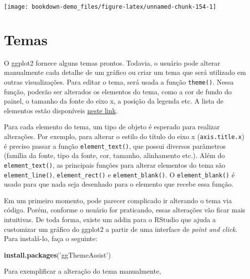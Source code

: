 \documentclass[]{book}
\newenvironment{Shaded}{\begin{snugshade}}{\end{snugshade}}
\newcommand{\KeywordTok}[1]{\textcolor[rgb]{0.13,0.29,0.53}{\textbf{#1}}}
\newcommand{\StringTok}[1]{\textcolor[rgb]{0.31,0.60,0.02}{#1}}
\newcommand{\NormalTok}[1]{#1}
\begin{document}
\begin{center}\texttt{[image: bookdown-demo\_files/figure-latex/unnamed-chunk-154-1]} \end{center}

\section{Temas}\label{temas}

O ggplot2 fornece alguns temas prontos. Todavia, o usuário pode alterar
manualmente cada detalhe de um gráfico ou criar um tema que será
utilizado em outras visualizações. Para editar o tema, será usada a
função \texttt{theme()}. Nessa função, poderão ser alterados os
elementos do tema, como a cor de fundo do painel, o tamanho da fonte do
eixo x, a posição da legenda etc. A lista de elementos estão disponíveis
\href{http://docs.ggplot2.org/current/theme.html}{neste link}.

Para cada elemento do tema, um tipo de objeto é esperado para realizar
alterações. Por exemplo, para alterar o estilo do título do eixo x
(\texttt{axis.title.x}) é preciso passar a função
\texttt{element\_text()}, que possui diversos parâmetros (família da
fonte, tipo da fonte, cor, tamanho, alinhamento etc.). Além do
\texttt{element\_text()}, as principais funções para alterar elementos
do tema são \texttt{element\_line()}, \texttt{element\_rect()} e
\texttt{element\_blank()}. O \texttt{element\_blank()} é usado para que
nada seja desenhado para o elemento que recebe essa função.

Em um primeiro momento, pode parecer complicado ir alterando o tema via
código. Porém, conforme o usuário for praticando, essas alterações vão
ficar mais intuitivas. De toda forma, existe um addin para o RStudio que
ajuda a customizar um gráfico do ggplot2 a partir de uma interface de
\emph{point and click}. Para instalá-lo, faça o seguinte:

\begin{Shaded}
\begin{Highlighting}[]
\KeywordTok{install.packages}\NormalTok{(}\StringTok{'ggThemeAssist'}\NormalTok{)}
\end{Highlighting}
\end{Shaded}

Para exemplificar a alteração do tema manualmente,
\end{document}
